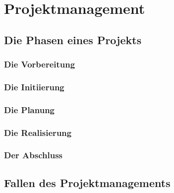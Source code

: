 \chapter				{Projektmanagement}											
	\section 			{Die Phasen eines Projekts}										
		\subsection 	{Die Vorbereitung}												
		\subsection 	{Die Initiierung}												
		\subsection 	{Die Planung}													
		\subsection 	{Die Realisierung}												
		\subsection 	{Der Abschluss}													
	\section 			{Fallen des Projektmanagements}									
